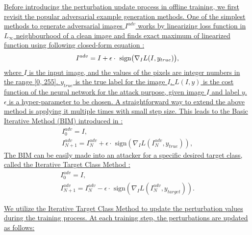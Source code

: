 \documentclass[12pt]{article}
\begin{document}
\uline{Before introducing the perturbation update process in offline training, we first revisit the popular adversarial example generation methods. One of the simplest methods to generate adversarial images $I^{adv}$ works by linearizing loss function in $L_{\infty}$ neighbourhood of a clean image and finds exact maximum of linearized function using following closed-form equation \cite{FGSM}:}
\begin{equation}
    I^{adv} = I + \epsilon \cdot \text{ sign} \bigl( \nabla_I L(I, y_{true})  \bigr),
    \vspace{-0.1cm}
\end{equation}
\uline{where $I$ is the input image, and the values of the pixels are integer numbers in the range [0, 255]. $y_{true}$ is the true label for the image $I$. $L(I, y)$ is the cost function of the neural network for the attack purpose, given image $I$ and label $y$. $\epsilon$ is a hyper-parameter to be chosen. A straightforward way to extend the above method is applying it multiple times with small step size. This leads to the Basic Iterative Method (BIM) introduced in \cite{DBLP:conf/iclr/KurakinGB17a}:}
\begin{equation}
    \begin{gathered}
        I_0^{adv} = I, \\
        I_{N+1}^{adv} = I_N^{adv}+\epsilon \cdot \text{ sign}(\nabla_I L(I_N^{adv},y_{true})),
    \end{gathered}
\end{equation}
\uline{The BIM can be easily made into an attacker for a specific desired target class, called the Iterative Target Class Method \cite{DBLP:conf/iclr/KurakinGB17a}:}
\begin{equation}
  \begin{gathered}
      I_0^{adv} = I,\\
      I_{N+1}^{adv} = I_N^{adv}-\epsilon \cdot \text{ sign}(\nabla_I L(I_N^{adv},y_{target})).
  \end{gathered}
  \label{equ:itcm}
\end{equation}

\uline{
We utilize the Iterative Target Class Method to update the perturbation values during the training process. At each training step, the perturbations are updated as follows:}
\end{document}
